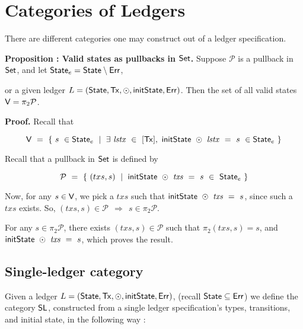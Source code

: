 \section{Categories of Ledgers}
\label{sec:cats}

There are different categories one may construct out of a ledger specification.

\textbf{Proposition : Valid states as pullbacks in $\mathsf{Set}$. } Suppose
$\mathcal{P}$ is a pullback in $\mathsf{Set}$, and let $\mathsf{State}_e = \mathsf{State} \setminus \mathsf{Err}$, \newline

\begin{center}
\end{center}

or a given ledger $L = (\mathsf{State}, \mathsf{Tx}, \odot, \mathsf{initState}, \mathsf{Err})$. Then the set of all
valid states $\mathsf{V} = \pi_2 \mathcal{P}$.

\textbf{Proof. } Recall that

\[ \mathsf{V}~=~ \{ ~s~\in \mathsf{State}_e~ \mid ~\exists~\mathit{lstx}~\in~[\mathsf{Tx}],~\mathsf{initState}~\odot~\mathit{lstx}~=~s~\in \mathsf{State}_e~\} \]

Recall that a pullback in $\mathsf{Set}$ is defined by

\[ \mathcal{P}~=~ \{ ~(txs, s)~ \mid ~\mathsf{initState}~\odot~\mathit{txs}~=~s~\in~\mathsf{State}_e ~\} \]

Now, for any $s \in \mathsf{V}$, we pick a $txs$ such that $\mathsf{initState}~\odot~\mathit{txs}~=~s$,
since such a $txs$ exists. So, $(txs, s) \in \mathcal{P} ~~\Rightarrow ~~s \in \pi_2 \mathcal{P}$.

For any $s \in \pi_2 \mathcal{P}$, there exists $(txs, s) \in \mathcal{P}$ such that
$\pi_2 (txs, s) = s$, and $\mathsf{initState}~\odot~\mathit{txs}~=~s$, which proves the result.

\subsection{Single-ledger category}
\label{sec:slc}

Given a ledger $L = (\mathsf{State}, \mathsf{Tx}, \odot, \mathsf{initState}, \mathsf{Err})$, (recall $\mathsf{State} \subseteq \mathsf{Err}$)
we define the category $\mathsf{SL}$, constructed
from a single ledger specification's types, transitions, and initial state,
in the following way :

